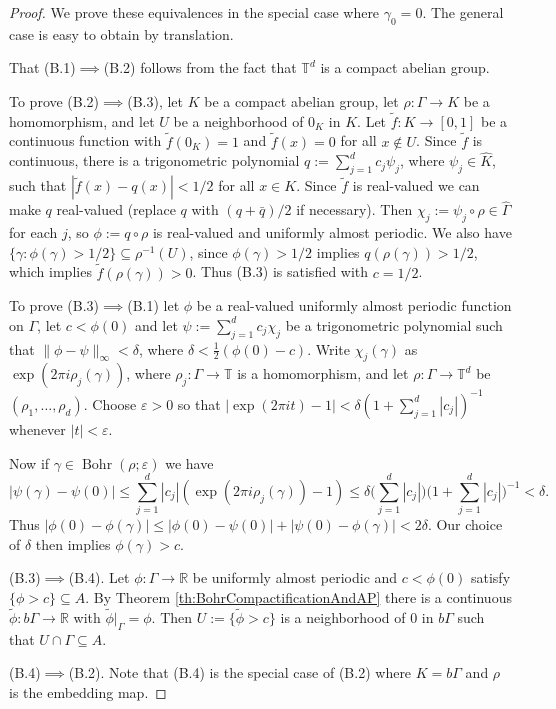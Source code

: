 \documentclass[12pt]{amsart} \usepackage{amsmath,centernot,amssymb,leftindex}
\newcommand{\Bohr}{\operatorname{Bohr}}
\numberwithin{theorem}{section}
\numberwithin{equation}{section}
\theoremstyle{definition}
\begin{document}
	\begin{proof}  We prove these equivalences in the special case where $\gamma_{0}=0$.  The general case is easy to obtain by translation.
		
		That (B.1)$\implies$(B.2) follows from the fact that $\mathbb T^d$ is a compact abelian group.
		
		To prove (B.2)$\implies$(B.3), let $K$ be a compact abelian group, let $\rho:\Gamma\to K$ be a homomorphism, and let $U$ be a neighborhood of $0_K$ in $K$.  Let $\tilde{f}:K\to [0,1]$ be a continuous function with $\tilde{f}(0_K)=1$ and $\tilde{f}(x)=0$ for all $x\notin U$.  Since $\tilde{f}$ is continuous, there is a trigonometric polynomial $q:=\sum_{j=1}^d c_j\psi_j$, where $\psi_j\in \widehat{K}$, such that $|\tilde{f}(x)-q(x)|<1/2$ for all $x\in K$.  Since $\tilde{f}$ is real-valued we can make $q$ real-valued (replace $q$ with $(q+\bar{q})/2$ if necessary).  Then $\chi_j:=\psi_j\circ \rho\in \widehat{\Gamma}$ for each $j$, so $\phi:=q\circ \rho$ is real-valued and uniformly almost periodic.  We also have $\{\gamma: \phi(\gamma)>1/2\}\subseteq \rho^{-1}(U)$, since $\phi(\gamma)>1/2$ implies $q(\rho(\gamma))>1/2$, which implies $\tilde{f}(\rho(\gamma))>0$.  Thus (B.3) is satisfied with $c=1/2$.
		
		To prove (B.3)$\implies$(B.1) let $\phi$ be a real-valued uniformly almost periodic function on $\Gamma$, let $c<\phi(0)$ and let $\psi:=\sum_{j=1}^d c_j\chi_j$ be a trigonometric polynomial such that $\|\phi - \psi\|_\infty<\delta$, where $\delta< \frac{1}{2}(\phi(0) - c)$.  Write $\chi_j(\gamma)$ as $\exp(2\pi i\rho_j(\gamma))$, where $\rho_j:\Gamma \to \mathbb T$ is a homomorphism, and let $\rho:\Gamma\to \mathbb T^d$ be $(\rho_1,\dots,\rho_d)$.  Choose $\varepsilon>0$ so that $|\exp(2\pi i t)-1|<\delta(1+\sum_{j=1}^d|c_j|)^{-1}$ whenever $|t|<\varepsilon$.  
		
		
		Now if $\gamma\in \Bohr(\rho;\varepsilon)$ we have \[|\psi(\gamma)-\psi(0)|\leq \sum_{j=1}^d |c_j|(\exp(2\pi i\rho_j(\gamma))-1)\leq \delta \bigl(\sum_{j=1}^d |c_j|\bigr)\bigl(1+\sum_{j=1}^{d}|c_j|\bigr)^{-1}<\delta.\]
		Thus $|\phi(0)-\phi(\gamma)|\leq |\phi(0)-\psi(0)|+|\psi(0)-\phi(\gamma)|<2\delta$.  Our choice of $\delta$ then implies $\phi(\gamma)>c$.
		
		(B.3)$\implies$(B.4).  Let $\phi:\Gamma\to \mathbb R$ be uniformly almost periodic and $c<\phi(0)$ satisfy $\{\phi>c\}\subseteq A$. By Theorem \ref{th:BohrCompactificationAndAP}  there is a continuous $\tilde{\phi}:b\Gamma\to \mathbb R$ with $\tilde{\phi}|_\Gamma = \phi$.  Then $U:=\{\tilde{\phi}>c\}$ is a neighborhood of $0$ in $b\Gamma$ such that $U\cap \Gamma\subseteq A$.
		
		(B.4)$\implies$(B.2).  Note that (B.4) is the special case of (B.2) where $K=b\Gamma$ and $\rho$ is the embedding map.
	\end{proof}
	
\end{document}
